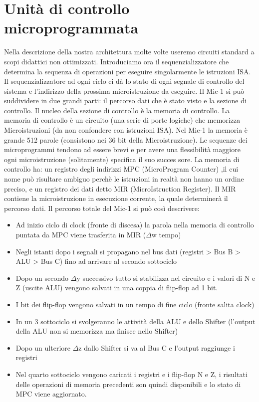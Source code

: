 \section{Unità di controllo microprogrammata}
Nella descrizione della nostra architettura molte volte useremo circuiti standard a scopi didattici non ottimizzati. 
Introduciamo ora il sequenzializzatore che determina la sequenza di operazioni per eseguire singolarmente le istruzioni ISA. Il sequenzializzatore ad ogni ciclo ci dà lo stato di ogni segnale di controllo del sistema e l'indirizzo della prossima microistruzione da eseguire. Il Mic-1 si può suddividere in due grandi parti: il percorso dati che è stato visto e la sezione di controllo. Il nucleo della sezione di controllo è la memoria di controllo. La memoria di controllo è un circuito (una serie di porte logiche) che memorizza Microistruzioni (da non confondere con istruzioni ISA). Nel Mic-1 la memoria è grande 512 parole (consistono nei 36 bit della Microistruzione).
Le sequenze dei microprogrammi tendono ad essere brevi e per avere una flessibilità maggiore ogni microistruzione (solitamente) specifica il suo succes sore.
La memoria di controllo ha: un registro degli indirizzi MPC (MicroProgram Counter) ,il cui nome può risultare ambiguo perchè le istruzioni in realtà non hanno un ordine preciso, e un registro dei dati detto MIR (MicroIstruction Register). Il MIR contiene la microistruzione in esecuzione corrente, la quale determinerà il percorso dati.
Il percorso totale del Mic-1 si può così descrivere:
\begin{itemize}
\item Ad inizio ciclo di clock (fronte di discesa) la parola nella memoria di controllo puntata da MPC viene trasferita in MIR ($\Delta$w tempo)
\item Negli istanti dopo i segnali si propagano nel bus dati (registri > Bus B > ALU > Bus C) fino ad arrivare al secondo sottociclo
\item Dopo un secondo $\Delta$y successivo tutto si stabilizza nel circuito e i valori di N e Z (uscite ALU) vengono salvati in una coppia di flip-flop ad 1 bit.
\item I bit dei flip-flop vengono salvati in un tempo di fine ciclo (fronte salita clock)
\item In un 3 sottociclo si svolgeranno le attività della ALU e dello Shifter (l'output della ALU non si memorizza ma finisce nello Shifter)
\item Dopo un ulteriore $\Delta$z dallo Shifter si va al Bus C e l'output raggiunge i registri
\item Nel quarto sottociclo vengono caricati i registri e i flip-flop N e Z, i risultati delle operazioni di memoria precedenti son quindi disponibili e lo stato di MPC viene aggiornato.
\end{itemize}
